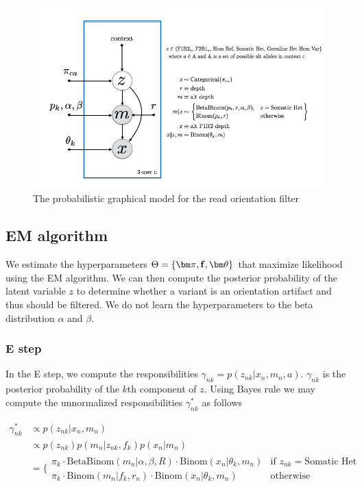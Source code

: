 \documentclass[a4paper]{article}
\newcommand{\vf}{{\bf f}}
\newcommand{\vpi}{{\bm \pi}}
\newcommand{\vtheta}{{\bm \theta}}
\begin{document}
\begin{figure}
\centering
\includegraphics[width=1\textwidth]{pgm.png}
\caption{\label{fig:pgm} The probabilistic graphical model for the read orientation filter}
\end{figure}


\subsection{EM algorithm}
We estimate the hyperparameters $\Theta = \{ \vpi, \vf, \vtheta \}$ that maximize likelihood using the EM algorithm. We can then compute the posterior probability of the latent variable $z$ to determine whether a variant is an orientation artifact and thus should be filtered. We do not learn the hyperparameters to the beta distribution $\alpha$ and $\beta$.

\subsubsection{E step}
In the E step, we compute the responsibilities $\gamma_{nk} = p(z_{nk} | x_n, m_n, a)$. $\gamma_{nk}$ is the posterior probability of the $k$th component of $z$. Using Bayes rule we may compute the unnormalized responsibilities $\gamma^*_{nk}$ as follows

\begin{align}
\gamma^*_{nk} &\propto p(z_{nk} | x_n, m_n) \nonumber \\
		        &\propto p(z_{nk}) p(m_n | z_{nk}, f_{k} ) p(x_n | m_n ) \nonumber \\
		        &=  \Big \{ \begin{array}{ll}
        				\pi_{k} \cdot \mathrm{BetaBinom}(m_n | \alpha, \beta, R) \cdot \mathrm{Binom}(x_n | \theta_k, m_n) 	&\text{if } z_{nk} = \text{Somatic Het} \\
			        \pi_{k} \cdot \mathrm{Binom}(m_n | f_k, r_n) \cdot \mathrm{Binom}(x_n | \theta_k, m_n) 	&\text{otherwise} \label{eq:posterior}
			     \end{array}
\end{align}
\end{document}
